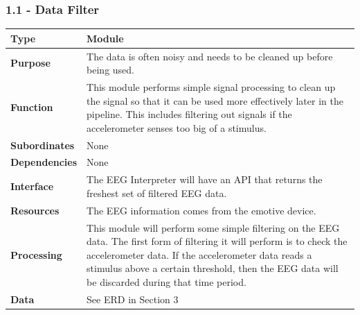 \documentclass{article}
\begin{document}
\subsubsection*{1.1 - Data Filter}
\begin{tabular}{ | l |  p{13.3cm} |}
\hline
\textbf{Type} & Module \\ \hline
\textbf{Purpose} & The data is often noisy and needs to be cleaned up before being used. \\ \hline
\textbf{Function} & This module performs simple signal processing to clean up the signal so that it can be used more effectively later in the pipeline. This includes filtering out signals if the accelerometer senses too big of a stimulus. \\ \hline
\textbf{Subordinates} & None \\ \hline
\textbf{Dependencies} & None\\ \hline
\textbf{Interface} & The EEG Interpreter will have an API that returns the freshest set of filtered EEG data. \\ \hline
\textbf{Resources} & The EEG information comes from the emotive device. \\ \hline
\textbf{Processing} & This module will perform some simple filtering on the EEG data. The first form of filtering it will perform is to check the accelerometer data. If the accelerometer data reads a stimulus above a certain threshold, then the EEG data will be discarded during that time period.\\ \hline
\textbf{Data} & See ERD in Section 3 \\ \hline
\end{tabular}
\end{document}
